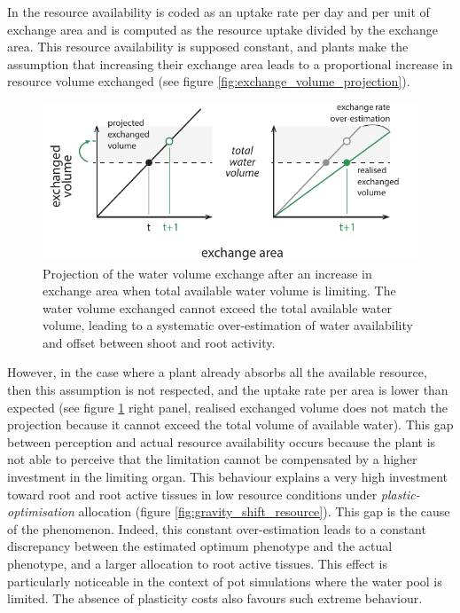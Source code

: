 In \model the resource availability is coded as an uptake rate per day and per unit of exchange area and is computed as the resource uptake divided by the exchange area. This resource availability is supposed constant, and plants make the assumption that increasing their exchange area leads to a proportional increase in resource volume exchanged (see figure \ref{fig:exchange_volume_projection}).

\begin{figure}
\includegraphics[width = \textwidth]{./2_PP/Figures/Concepts/exhaustion2.pdf}
\caption{Projection of the water volume exchange after an increase in exchange area when total available water volume is limiting. The water volume exchanged cannot exceed the total available water volume, leading to a systematic over-estimation of water availability and offset between shoot and root activity.}\label{fig:exhaustion}
\end{figure}

However, in the case where a plant already absorbs all the available resource, then this assumption is not respected, and the uptake rate per area is lower than expected (see figure \ref{fig:exhaustion} right panel, realised exchanged volume does not match the projection because it cannot exceed the total volume of available water). This gap between perception and actual resource availability occurs because the plant is not able to perceive that the limitation cannot be compensated by a higher investment in the limiting organ. This behaviour explains a very high investment toward root and root active tissues in low resource conditions under \textit{plastic-optimisation} allocation (figure \ref{fig:gravity_shift_resource}). This gap is the cause of the  phenomenon. Indeed, this constant over-estimation leads to a constant discrepancy between the estimated optimum phenotype and the actual phenotype, and a larger allocation to root active tissues. This effect is particularly noticeable in the context of pot simulations where the water pool is limited. The absence of plasticity costs also favours such extreme behaviour. 

